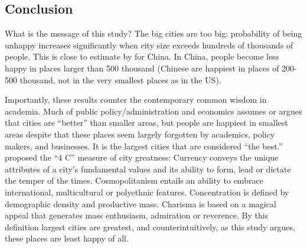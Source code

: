 \documentclass[12pt, letterpaper]{article}
\begin{document}
\begin{spacing}{1.9}
\section*{Conclusion}

What is the message of this study? %
The big cities are too big: probability of being unhappy increases significantly
 when city size exceeds
 hundreds of thousands of people.  This is close to estimate by \citet{chen15} for China. In China,
 people become less happy in places larger than 500 thousand (Chinese are
happiest in places of 200-500 thousand, not in the very smallest places as in the US).



Importantly, these results counter the contemporary common
wisdom in academia. Much of public policy/administration  and
economics assumes or argues that cities are ``better'' than  smaller areas, but
people are happiest in smallest areas despite  that these places seem
largely forgotten by academics, policy makers, and businesses. It is the largest
cities that are considered ``the best.''
 \citet{savitch10} proposed the ``4 C'' measure of city greatness: Currency conveys the
 unique attributes of a city's fundamental values and its ability to form, lead
 or dictate the temper of the times. Cosmopolitanism entails an ability to
 embrace international, multicultural or polyethnic features. Concentration is
 defined by demographic density and productive mass. Charisma is based on a
 magical appeal that generates mass enthusiasm, admiration or reverence. By this
 definition largest cities are greatest, and counterintuitively, as this study
 argues, these places are least happy of all.


\end{spacing}
\end{document}
